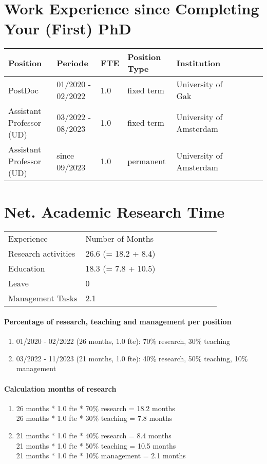 \documentclass[a4paper,9.5pt,fleqn]{application}
\begin{document}
\section{Work Experience since Completing Your (First) PhD}

\begin{tabular}{lllllllll}
Position & Periode & FTE & Position Type & Institution\\ \hline
PostDoc & 01/2020 - 02/2022 & 1.0 & fixed term & University of Gak\\
Assistant Professor (UD) & 03/2022 - 08/2023 & 1.0 & fixed term & University of Amsterdam\\
Assistant Professor (UD) & since 09/2023 & 1.0 & permanent & University of Amsterdam
\end{tabular}


\section{Net. Academic Research Time}
\begin{tabular}{lllllllll}
Experience& Number of Months\\
Research activities & 26.6 (= 18.2 + 8.4)\\
Education & 18.3 (= 7.8 + 10.5)\\
Leave & 0 \\
Management Tasks & 2.1 \\
\end{tabular}

\paragraph{Percentage of research, teaching and management per position}
\begin{enumerate}
	\item 01/2020 - 02/2022 (26 months, 1.0 fte): 70\% research, 30\% teaching
	\item 03/2022 - 11/2023 (21 months, 1.0 fte): 40\% research, 50\% teaching, 10\% management
\end{enumerate}

\paragraph{Calculation months of research}
\begin{enumerate}
	\item 26 months * 1.0 fte * 70\% research = 18.2 months\\ 
	      26 months * 1.0 fte * 30\% teaching = 7.8 months
	\item 21 months * 1.0 fte * 40\% research = 8.4 months\\
	      21 months * 1.0 fte * 50\% teaching = 10.5 months\\
	      21 months * 1.0 fte * 10\% management = 2.1 months
\end{enumerate}
\end{document}
